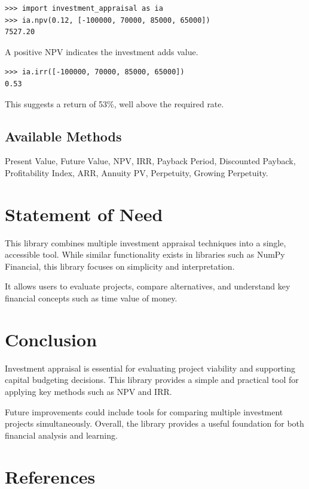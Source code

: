 \documentclass{article}
\begin{document}
\begin{verbatim}
>>> import investment_appraisal as ia
>>> ia.npv(0.12, [-100000, 70000, 85000, 65000])
7527.20
\end{verbatim}

A positive NPV indicates the investment adds value.

\begin{verbatim}
>>> ia.irr([-100000, 70000, 85000, 65000])
0.53
\end{verbatim}

This suggests a return of 53\%, well above the required rate.

\subsection*{Available Methods}
Present Value, Future Value, NPV, IRR, Payback Period, Discounted Payback, Profitability Index, ARR, Annuity PV, Perpetuity, Growing Perpetuity.

\section{Statement of Need}

This library combines multiple investment appraisal techniques into a single, accessible tool. While similar functionality exists in libraries such as NumPy Financial, this library focuses on simplicity and interpretation.

It allows users to evaluate projects, compare alternatives, and understand key financial concepts such as time value of money.

\section{Conclusion}

Investment appraisal is essential for evaluating project viability and supporting capital budgeting decisions. This library provides a simple and practical tool for applying key methods such as NPV and IRR.

Future improvements could include tools for comparing multiple investment projects simultaneously. Overall, the library provides a useful foundation for both financial analysis and learning.

\section*{References}
\end{document}
